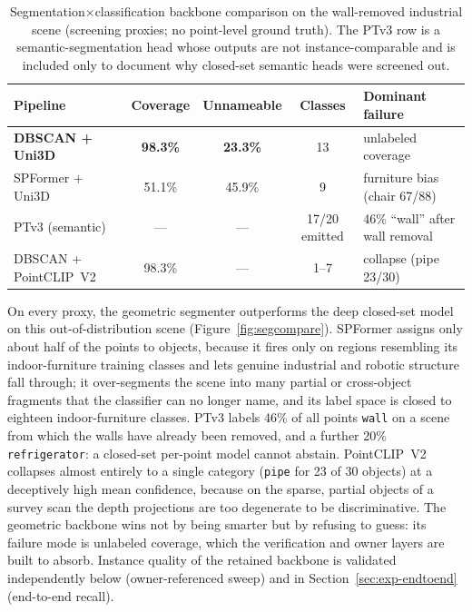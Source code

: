 \begin{table}[htbp]
\centering
\caption{Segmentation$\times$classification backbone comparison on the
wall-removed industrial scene (screening proxies; no point-level ground
truth). The PTv3 row is a semantic-segmentation head whose outputs are not
instance-comparable and is included only to document why closed-set semantic
heads were screened out.}
\label{tab:backbones}
\begin{tabularx}{\textwidth}{l c c c X}
\toprule
\textbf{Pipeline} & \textbf{Coverage} & \textbf{Unnameable} & \textbf{Classes} & \textbf{Dominant failure} \\
\midrule
\textbf{DBSCAN + Uni3D} & \textbf{98.3\%} & \textbf{23.3\%} & 13 & unlabeled coverage \\
SPFormer + Uni3D & 51.1\% & 45.9\% & 9 & furniture bias (chair 67/88) \\
PTv3 (semantic) & --- & --- & 17/20 emitted & 46\% ``wall'' after wall removal \\
DBSCAN + PointCLIP~V2 & 98.3\% & --- & 1--7 & collapse (pipe 23/30) \\
\bottomrule
\end{tabularx}
\end{table}

On every proxy, the geometric segmenter outperforms the deep closed-set model
on this out-of-distribution scene (Figure~\ref{fig:segcompare}). SPFormer
assigns only about half of the points to objects, because it fires only on
regions resembling its indoor-furniture training classes and lets genuine
industrial and robotic structure fall through; it over-segments the scene into
many partial or cross-object fragments that the classifier can no longer name,
and its label space is closed to eighteen indoor-furniture classes. PTv3 labels
46\% of all points \texttt{wall} on a scene from which the walls have already
been removed, and a further 20\% \texttt{refrigerator}: a closed-set per-point
model cannot abstain. PointCLIP~V2 collapses almost entirely to a single
category (\texttt{pipe} for 23 of 30 objects) at a deceptively high mean
confidence, because on the sparse, partial objects of a survey scan the depth
projections are too degenerate to be discriminative. The geometric backbone
wins not by being smarter but by refusing to guess: its failure mode is
unlabeled coverage, which the verification and owner layers are built to
absorb. Instance quality of the retained backbone is validated independently
below (owner-referenced sweep) and in Section~\ref{sec:exp-endtoend}
(end-to-end recall).


